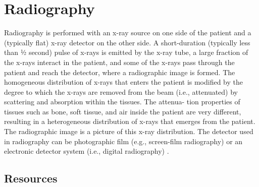 \chapter{Radiography}

Radiography is performed with an x-ray source on one side of the
patient and a (typically flat) x-ray detector on the other side. A
short-duration (typically less than ½ second) pulse of x-rays is
emitted by the x-ray tube, a large fraction of the x-rays interact in
the patient, and some of the x-rays pass through the patient and reach
the detector, where a radiographic image is formed. The homogeneous
distribution of x-rays that enters the patient is modified by the
degree to which the x-rays are removed from the beam (i.e.,
attenuated) by scattering and absorption within the tissues. The
attenua- tion properties of tissues such as bone, soft tissue, and air
inside the patient are very different, resulting in a heterogeneous
distribution of x-rays that emerges from the patient. The radiographic
image is a picture of this x-ray distribution. The detector used in
radiography can be photographic film (e.g., screen-film radiography)
or an electronic detector system (i.e., digital radiography)
\cite{bushberg2011essential}.

\section{Resources}



